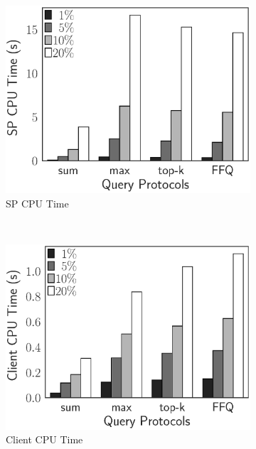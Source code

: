\begin{figure}[t]
  \centering
  \begin{subfigure}[b]{.33\linewidth}
    \centering
    \includegraphics[height=\ht\figbox]{exp-figs/aggregate-queries/pgp_sp.eps}
    \caption{SP CPU Time}
  \end{subfigure}~%
  \begin{subfigure}[b]{.33\linewidth}
    \centering
    \includegraphics[height=\ht\figbox]{exp-figs/aggregate-queries/pgp_client.eps}
    \caption{Client CPU Time}
  \end{subfigure}~%
  \begin{subfigure}[b]{.33\linewidth}
    \centering

\end{subfigure}
\end{figure}
